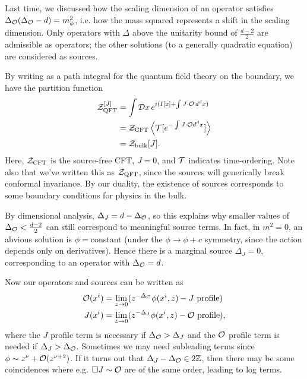 Last time, we discussed how the scaling dimension of an operator satisfies $\Delta_\mathcal O (\Delta_\mathcal O -d) = m_\phi^2$, i.e. how the mass squared represents a shift in the scaling dimension. Only operators with $\Delta$ above the unitarity bound of $\frac{d-2}{2}$ are admissible as operators; the other solutions (to a generally quadratic equation) are considered as sources.

By writing as a path integral for the quantum field theory on the boundary, we have the partition function
\begin{align}
    \mathcal Z_\text{QFT}^{[J]} &= \int \mathcal{D} x \, e^{i(I[x] + \int J \cdot \mathcal O \, d^dx)}\\
        &= \mathcal Z_{\text{CFT}} \left< \mathcal T [e^{-\int J\cdot \mathcal O d^dx}] \right>\\
        &= \mathcal Z_\text{bulk}[J].
\end{align}
Here, $\mathcal Z_\text{CFT}$ is the source-free CFT, $J=0$, and $\mathcal T$ indicates time-ordering. Note also that we've written this as $\mathcal Z_\text{QFT}$, since the sources will generically break conformal invariance. By our duality, the existence of sources corresponds to some boundary conditions for physics in the bulk.

By dimensional analysis, $\Delta_J = d-\Delta_\mathcal O$, so this explains why smaller values of $\Delta_\mathcal O < \frac{d-2}{2}$ can still correspond to meaningful source terms. In fact, in $m^2=0$, an abvious solution is $\phi={}$constant (under the $\phi\to \phi+c$ symmetry, since the action depends only on derivatives). Hence there is a marginal source $\Delta_J=0$, corresponding to an operator with $\Delta_\mathcal O=d$.

Now our operators and sources can be written as
\begin{align}
    \mathcal O(x^i) &= \lim_{z\to 0} (z^{-\Delta_\mathcal O} \phi(x^i,z) - J\text{ profile})\\
    J(x^i) &= \lim_{z\to 0} (z^{-\Delta_J} \phi(x^i,z) - \mathcal O\text{ profile}),
\end{align}
where the $J$ profile term is necessary if $\Delta_\mathcal O > \Delta_J$ and the $\mathcal O$ profile term is needed if $\Delta_J > \Delta_\mathcal O$. Sometimes we may need subleading terms since $\phi \sim z^\nu+\mathcal O(z^{\nu+2})$. If it turns out that $\Delta_J -\Delta_\mathcal O \in 2\mathbb{Z}$, then there may be some coincidences where e.g. $\Box J \sim \mathcal O$ are of the same order, leading to log terms.

